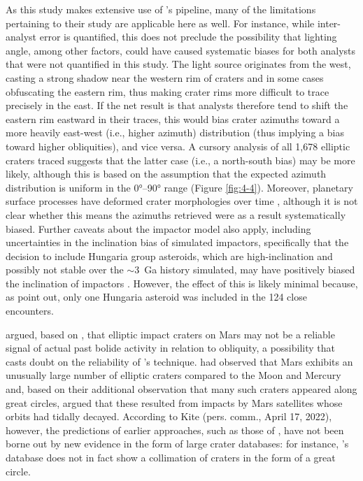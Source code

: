 \documentclass{ucetd}
\begin{document}
As this study makes extensive use of \citet{holo2018a}’s pipeline, many of the limitations pertaining to their study are applicable here as well. For instance, while inter-analyst error is quantified, this does not preclude the possibility that lighting angle, among other factors, could have caused systematic biases for both analysts that were not quantified in this study. The light source originates from the west, casting a strong shadow near the western rim of craters and in some cases obfuscating the eastern rim, thus making crater rims more difficult to trace precisely in the east. If the net result is that analysts therefore tend to shift the eastern rim eastward in their traces, this would bias crater azimuths toward a more heavily east-west (i.e., higher azimuth) distribution (thus implying a bias toward higher obliquities), and vice versa. A cursory analysis of all 1,678 elliptic craters traced suggests that the latter case (i.e., a north-south bias) may be more likely, although this is based on the assumption that the expected azimuth distribution is uniform in the 0°--90° range (Figure \ref{fig:4-4}). Moreover, planetary surface processes have deformed crater morphologies over time \citep{weiss2019a}, although it is not clear whether this means the azimuths retrieved were as a result systematically biased. Further caveats about the impactor model also apply, including uncertainties in the inclination bias of simulated impactors, specifically that the decision to include Hungaria group asteroids, which are high-inclination and possibly not stable over the $\sim$3~Ga history simulated, may have positively biased the inclination of impactors \citep{bottke2002a, bottke2012a, cuk2012a, jeongahn2015a, cuk2017a}. However, the effect of this is likely minimal because, as \citet{holo2018a} point out, only one Hungaria asteroid was included in the 124 close encounters.

\citet{jakosky2021a} argued, based on \citet{schultz1982a}, that elliptic impact craters on Mars may not be a reliable signal of actual past bolide activity in relation to obliquity, a possibility that casts doubt on the reliability of \cite{holo2018a}’s technique. \cite{schultz1982a} had observed that Mars exhibits an unusually large number of elliptic craters compared to the Moon and Mercury and, based on their additional observation that many such craters appeared along great circles, argued that these resulted from impacts by Mars satellites whose orbits had tidally decayed. According to Kite (pers. comm., April 17, 2022), however, the predictions of earlier approaches, such as those of \citet{schultz1982a}, have not been borne out by new evidence in the form of large crater databases: for instance, \citet{robbins2012a}’s database does not in fact show a collimation of craters in the form of a great circle.
\end{document}
